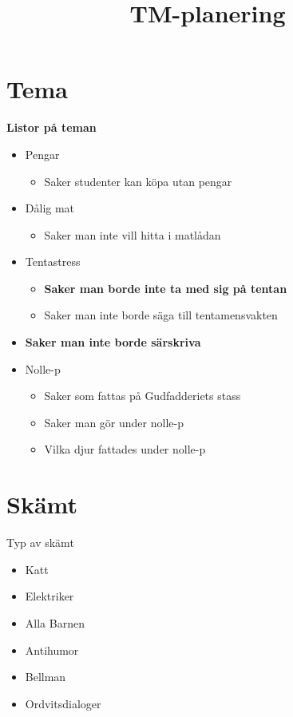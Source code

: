 \documentclass{article}
\title{TM-planering} \date{}
\begin{document}
\maketitle
\section{Tema}
\label{sec:tema}

\textbf{Listor på teman}
\begin{itemize}
\item Pengar
  \begin{itemize}
  \item Saker studenter kan köpa utan pengar
  \end{itemize}
\item Dålig mat
  \begin{itemize}
  \item Saker man inte vill hitta i matlådan
  \end{itemize}
\item Tentastress
  \begin{itemize}
  \item \textbf{Saker man  borde inte ta med sig på tentan}
  \item Saker man inte borde säga till tentamensvakten
  \end{itemize}
\item \textbf{Saker man inte borde särskriva}
\item Nolle-p
  \begin{itemize}
  \item Saker som fattas på Gudfadderiets stass
  \item Saker man gör under nolle-p
  \item Vilka djur fattades under nolle-p
  \end{itemize}
\end{itemize}

\section{Skämt}
\label{sec:skamt}

Typ av skämt
\begin{itemize}
\item Katt
\item Elektriker
\item Alla Barnen
\item Antihumor
\item Bellman
\item Ordvitsdialoger
\end{itemize}
\end{document}
